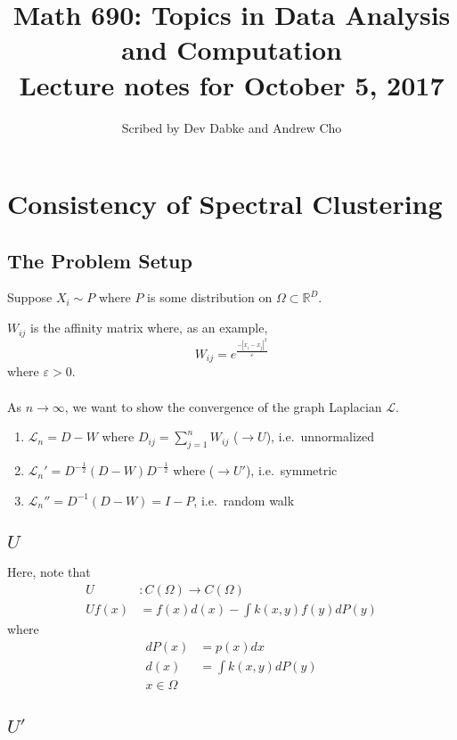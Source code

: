 \documentclass[12pt]{article}
\title{Math 690: Topics in Data Analysis and Computation \\
Lecture notes for October 5, 2017}
\date{}
\author{Scribed by Dev Dabke and Andrew Cho}
\theoremstyle{plain}
\begin{document}
\maketitle

\section{Consistency of Spectral Clustering}

\subsection{The Problem Setup}

Suppose $ X_{i} \sim P $ where $ P $ is some distribution on $ \Omega \subset \mathbb{R}^{D} $.

$ W_{ij} $ is the affinity matrix where, as an example,
\[
W_{ij} = e^{\frac{-|x_i - x_j|^2}{\varepsilon}}
\]
where $ \varepsilon > 0 $.
\\ \\
As $ n \to \infty $, we want to show the convergence of the graph Laplacian $ \mathcal{L} $.
\begin{enumerate}
  \item $ \mathcal{L}_{n} = D - W $ where $ D_{ij} = \sum_{j = 1}^{n} W_{ij} $ ($  \to U $), i.e.\ unnormalized
  \item $ \mathcal{L}_{n}' = D^{-\frac{1}{2}} (D - W) D^{-\frac{1}{2}} $ where ($  \to U' $), i.e.\ symmetric
  \item $ \mathcal{L}_{n}'' = D^{-1} (D - W) = I - P $, i.e.\ random walk
\end{enumerate}

\subsection{$ U $}

Here, note that
\begin{align*}
  U &: C(\Omega) \to C(\Omega) \\
  Uf(x) &= f(x)d(x) - \int k(x, y) f(y) dP(y)
\end{align*}
where
\begin{align*}
  dP(x) &= p(x)dx \\
  d(x) &= \int k(x, y) dP(y) \\
  x \in \Omega
\end{align*}

\subsection{$ U' $}
\end{document}
